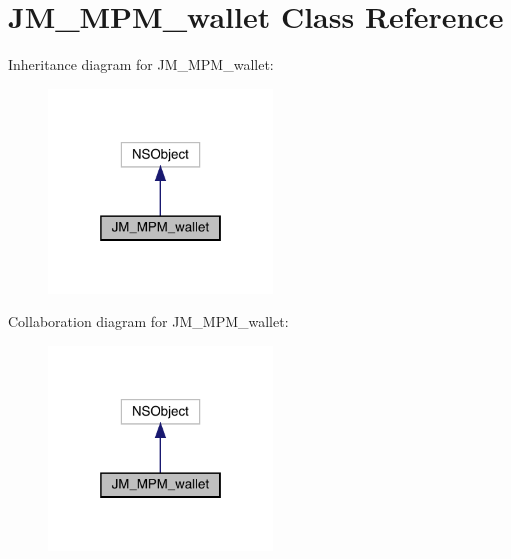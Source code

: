 \hypertarget{interface_j_m___m_p_m__wallet}{}\section{J\+M\+\_\+\+M\+P\+M\+\_\+wallet Class Reference}
\label{interface_j_m___m_p_m__wallet}


Inheritance diagram for J\+M\+\_\+\+M\+P\+M\+\_\+wallet\+:\nopagebreak
\begin{figure}[H]
\begin{center}
\leavevmode
\includegraphics[width=169pt]{interface_j_m___m_p_m__wallet__inherit__graph}
\end{center}
\end{figure}


Collaboration diagram for J\+M\+\_\+\+M\+P\+M\+\_\+wallet\+:\nopagebreak
\begin{figure}[H]
\begin{center}
\leavevmode
\includegraphics[width=169pt]{interface_j_m___m_p_m__wallet__coll__graph}
\end{center}
\end{figure}
